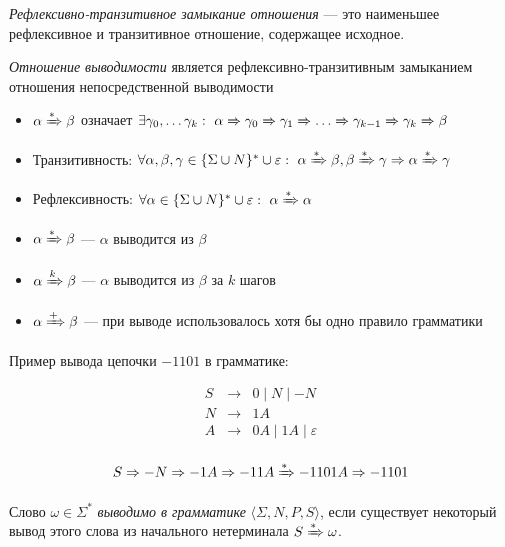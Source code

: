 \begin{definition}
  \textit{Рефлексивно-транзитивное замыкание отношения} --- это наименьшее рефлексивное и транзитивное отношение, содержащее исходное.
\end{definition}

\begin{definition}
\textit{Отношение выводимости} является рефлексивно-транзитивным замыканием отношения непосредственной выводимости
\begin{itemize}
  \item $\alpha \derives \beta$ означает $\exists \gamma_0, \dots \gamma_k: \ \alpha \derives[] \gamma_0 \derives[] \gamma_1 \derives[] \dots \derives[] \gamma_{k-1} \derives[] \gamma_{k} \derives[] \beta$
  \item Транзитивность: $\forall \alpha, \beta, \gamma \in \{\Sigma \cup N\}^* \cup {\varepsilon}: \ \alpha \derives \beta, \beta \derives \gamma \Rightarrow \alpha \derives \gamma$
  \item Рефлексивность: $\forall \alpha \in \{\Sigma \cup N\}^* \cup {\varepsilon}: \ \alpha \derives \alpha$
  \item $\alpha \derives \beta$ --- $\alpha$ выводится из $\beta$
  \item $\alpha \derives[k] \beta$ --- $\alpha$ выводится из $\beta$ за $k$ шагов
  \item $\alpha \derives[+] \beta$ --- при выводе использовалось хотя бы одно правило грамматики
\end{itemize}
\end{definition}


\begin{example}
Пример вывода цепочки $-1101$ в грамматике:

  \[
  \begin{array}{rcl}
  S& \rightarrow & 0 \mid N \mid - N  \\
  N& \rightarrow & 1 A \\
  A& \rightarrow & 0 A \mid 1 A  \mid \varepsilon\\
  \end{array}
  \]

  \[ S \Rightarrow - N \Rightarrow - 1 A \Rightarrow - 1 1 A \derives - 1 1 0 1 A \Rightarrow - 1 1 0 1 \]
\end{example}


\begin{definition}
Слово $\omega \in \Sigma^*$ \textit{выводимо в грамматике} $\langle \Sigma, N, P, S \rangle$, если существует некоторый вывод этого слова из начального нетерминала $S \derives \omega$.

\end{definition}

